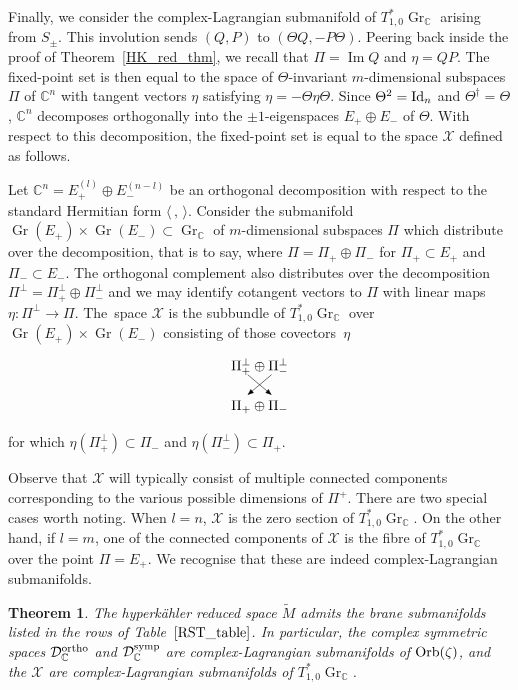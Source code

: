 \documentclass[pdftex]{sigma}
\numberwithin{equation}{section}
\newtheorem{Theorem}{Theorem}[section]
\DeclareMathOperator{\Imag}{Im}
\DeclareMathOperator{\Gr}{Gr}
\newcommand{\C}{\mathbb{C}}
\newcommand{\D}{\mathcal{D}}
\newcommand{\Id}{{\rm Id}}
\begin{document}
Finally, we consider the complex-Lagrangian submanifold of $T^*_{1,0}\Gr_\C$ arising from ${S}_\pm$. This involution sends $(Q,P)$ to $(\Theta Q, -P\Theta)$. Peering back inside the proof of Theorem~\ref{HK_red_thm}, we recall that $\Pi=\Imag Q$ and $\eta=QP$. The fixed-point set is then equal to the space of $\Theta$-invariant $m$-dimensional subspaces $\Pi$ of $\C^n$ with tangent vectors $\eta$ satisfying $\eta=-\Theta\eta\Theta$. Since $\Theta^2=\Id_n$ and $\Theta^\dagger=\Theta$, $\C^n$ decomposes orthogonally into the $\pm1$-eigenspaces $E_{+}\oplus E_{-}$ of $\Theta$. With respect to this decomposition, the fixed-point set is equal to the space $\mathcal{X}$ defined as follows.
\begin{Definition}
	Let $\C^n=E_{+}^{(l)}\oplus E_{-}^{(n-l)}$ be an orthogonal decomposition with respect to the standard Hermitian form $\langle\,,\,\rangle$. Consider the submanifold $\Gr(E_{+})\times\Gr(E_{-})\subset\Gr_\C$ of $m$-dimensional subspaces $\Pi$ which distribute over the decomposition, that is to say, where ${\Pi=\Pi_{+}\oplus\Pi_{-}}$ for $\Pi_{+}\subset E_+$ and $\Pi_-\subset E_-$. The orthogonal complement also distributes over the decomposition $\Pi^\perp=\Pi^\perp_+\oplus\Pi^\perp_-$ and we may identify cotangent vectors to $\Pi$ with linear maps $\eta\colon \Pi^\perp\rightarrow\Pi$. The~space $\mathcal{X}$ is the subbundle of $T^*_{1,0}\Gr_\C$ over $\Gr(E_+)\times\Gr(E_-)$ consisting of those covectors~$\eta$%
\[
		\begin{tikzpicture}
			\node at (0,.5){$\Pi^\perp_+\oplus \Pi^\perp_-$};
			\node at (0,-.5){$\Pi_+\oplus \Pi_-$};
			\draw[-{Latex}] (-0.3,.3) -- ++(-40:.8);
			\draw[-{Latex}] (0.3,.3) -- ++(-140:.8);
		\end{tikzpicture}
\]
	for which $\eta(\Pi^\perp_+)\subset\Pi_{-}$ and $\eta(\Pi^\perp_-)\subset\Pi_{+}$.
\end{Definition}

\begin{Remark}%
Observe that $\mathcal{X}$ will typically consist of multiple connected components corresponding to the various possible dimensions of $\Pi^+$. There are two special cases worth noting. When $l=n$, $\mathcal{X}$ is the zero section of $T^*_{1,0}\Gr_\C$. On the other hand, if $l=m$, one of the connected components of $\mathcal{X}$ is the fibre of $T^*_{1,0}\Gr_\C$ over the point $\Pi=E_+$. We recognise that these are indeed complex-Lagrangian submanifolds.
\end{Remark}

\begin{Theorem}The hyperk\"{a}hler reduced space $\tilde{M}$ admits the brane submanifolds listed in the rows of Table~$\ref{RST_table}$. In particular, the complex symmetric spaces $\D_{\C}^{\rm ortho}$ and $\D_\C^{\rm symp}$ are complex-Lagrangian submanifolds of ${\rm Orb}(\zeta)$, and the $\mathcal{X}$ are complex-Lagrangian submanifolds of $T^*_{1,0}\Gr_\C$.
\end{Theorem}
\end{document}
